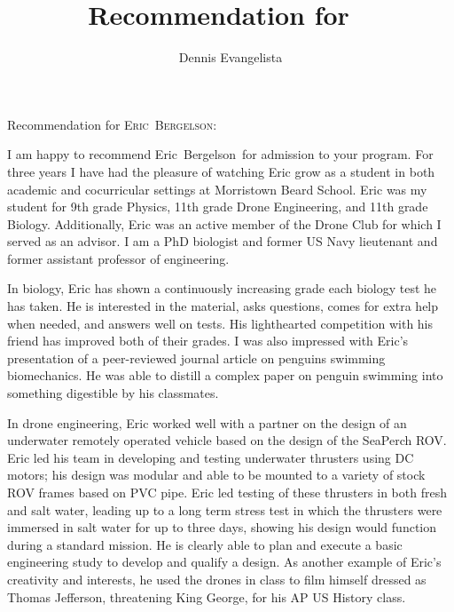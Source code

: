 \documentclass[12pt]{letter}
\title{Recommendation for \firstname\ \lastname}
\author{Dennis Evangelista}
\date{}
\newcommand\firstname{Eric}
\newcommand\lastname{Bergelson}
\begin{document}
\begin{letter}{%
}

\opening{Recommendation for {\scshape\firstname\ \lastname}:}

I am happy to recommend \firstname\ \lastname\ for admission to your program.  For three years I have had the pleasure of watching Eric grow as a student in both academic and cocurricular settings at Morristown Beard School. Eric was my student for 9th grade Physics, 11th grade Drone Engineering, and 11th grade Biology. Additionally, Eric was an active member of the Drone Club for which I served as an advisor.  I am a PhD biologist and former US Navy lieutenant and former assistant professor of engineering. 

In biology, Eric has shown a continuously increasing grade each biology test he has taken.  He is interested in the material, asks questions, comes for extra help when needed, and answers well on tests. His lighthearted competition with his friend has improved both of their grades. I was also impressed with Eric's presentation of a peer-reviewed journal article on penguins swimming biomechanics. He was able to distill a complex paper on penguin swimming into something digestible by his classmates.

In drone engineering, Eric worked well with a partner on the design of an underwater remotely operated vehicle based on the design of the SeaPerch ROV.  Eric led his team in developing and testing underwater thrusters using DC motors; his design was modular and able to be mounted to a variety of stock ROV frames based on PVC pipe. Eric led testing of these thrusters in both fresh and salt water, leading up to a long term stress test in which the thrusters were immersed in salt water for up to three days, showing his design would function during a standard mission. He is clearly able to plan and execute a basic engineering study to develop and qualify a design. As another example of Eric's creativity and interests, he used the drones in class to film himself dressed as Thomas Jefferson, threatening King George, for his AP US History class. 


\end{letter}
\end{document}
